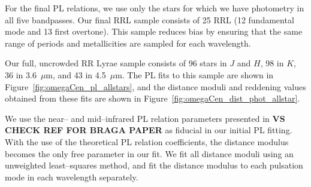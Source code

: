 \documentclass[a4paper,fleqn,usenatbib]{mnras}
\begin{document}





For the final PL relations, we use only the stars for which we have photometry in all five bandpasses. Our final RRL sample consists of 25 RRL (12 fundamental mode and 13 first overtone). This sample reduces bias by ensuring that the same range of periods and metallicities are sampled for each wavelength.

Our full, uncrowded RR Lyrae sample consists of 96 stars in $J$ and $H$, 98 in $K$, 36 in 3.6~$\mu$m, and 43 in 4.5~$\mu$m. The PL fits to this sample are shown in Figure~\ref{fig:omegaCen_pl_allstars}, and the distance moduli and reddening values obtained from these fits are shown in Figure~\ref{fig:omegaCen_dist_phot_allstar}.

We use the near-- and mid--infrared PL relation parameters presented in {\bf VS CHECK REF FOR BRAGA PAPER} as fiducial in our initial PL fitting. With the use of the theoretical PL relation coefficients, the distance modulus becomes the only free parameter in our fit. We fit all distance moduli using an unweighted least--squares method, and fit the distance modulus to each pulsation mode in each wavelength separately.
\end{document}
